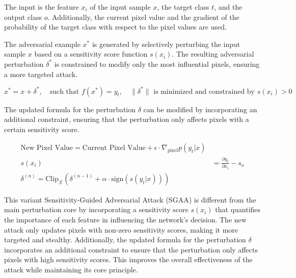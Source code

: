 The input is the feature \( x_i \) of the input sample \( x \), the target class \( t \), and the output class \( o \). Additionally, the current pixel value and the gradient of the probability of the target class with respect to the pixel values are used.

The adversarial example $ x^* $ is generated by selectively perturbing the input sample $ x $ based on a sensitivity score function $ s(x_i) $. The resulting adversarial perturbation $ \delta^* $ is constrained to modify only the most influential pixels, ensuring a more targeted attack.

\[
x^* = x + \delta^*, \quad \text{such that } f(x^*) = y_t, \quad \|\delta^*\| \text{ is minimized and constrained by } s(x_i) > 0
\]

The updated formula for the perturbation $\delta$ can be modified by incorporating an additional constraint, ensuring that the perturbation only affects pixels with a certain sensitivity score.

\begin{align*}
\text{New Pixel Value} = \text{Current Pixel Value} + \epsilon \cdot \nabla_{\text{pixel}} p(y_t | x) \\
s(x_i) &= \frac{\partial y_t}{\partial x_i} - s_o\\
\delta^{(n)} = \text{Clip}_{\mathcal{X}} \left( \delta^{(n-1)} + \alpha \cdot \text{sign} \left( s(y_t | x) \right) \right)
\end{align*}

This variant Sensitivity-Guided Adversarial Attack (SGAA) is different from the main perturbation core by incorporating a sensitivity score $s(x_i)$ that quantifies the importance of each feature in influencing the network's decision. The new attack only updates pixels with non-zero sensitivity scores, making it more targeted and stealthy. Additionally, the updated formula for the perturbation $\delta$ incorporates an additional constraint to ensure that the perturbation only affects pixels with high sensitivity scores. This improves the overall effectiveness of the attack while maintaining its core principle.